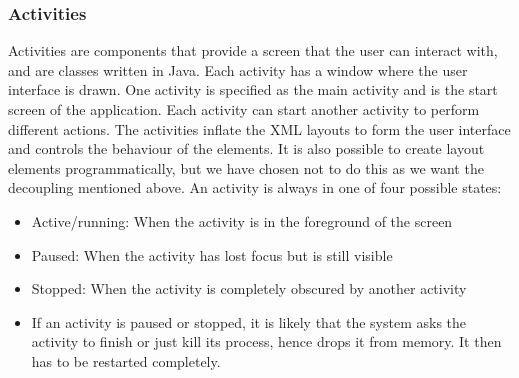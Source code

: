 \subsubsection{Activities}
Activities are components that provide a screen that the user can interact with, and are classes written in Java. Each activity has a window where the user interface is drawn. One activity is specified as the main activity and is the start screen of the application. Each activity can start another activity to perform different actions. The activities inflate the XML layouts to form the user interface and controls the behaviour of the elements. It is also possible to create layout elements programmatically, but we have chosen not to do this as we want the decoupling mentioned above.
\newline
\newline
An activity is always in one of four possible states\cite{bib:aas}:
\begin{itemize}
\item{}Active/running: When the activity is in the foreground of the screen
\item{}Paused: When the activity has lost focus but is still visible
\item{}Stopped: When the activity is completely obscured by another activity
\item{}If an activity is paused or stopped, it is likely that the system asks the activity to finish or just kill its process, hence drops it from memory. It then has to be restarted completely.
\end{itemize}

